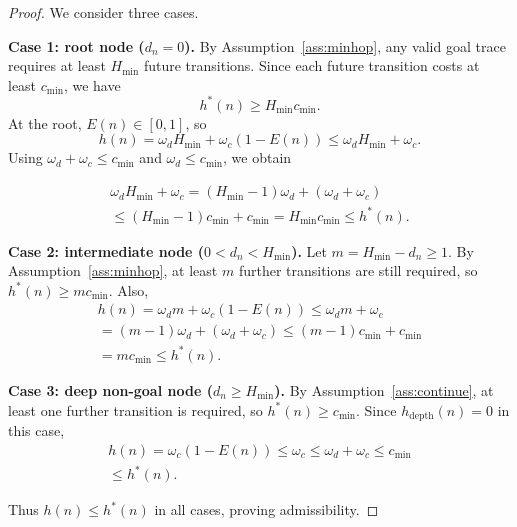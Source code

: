 \documentclass[11pt]{article}
\begin{document}
\begin{proof}
We consider three cases.

\noindent\textbf{Case 1: root node ($d_n=0$).}
By Assumption~\ref{ass:minhop}, any valid goal trace requires at least $H_{\min}$ future transitions. Since each future transition costs at least $c_{\min}$, we have
\[
h^*(n) \geq H_{\min} c_{\min}.
\]
At the root, $E(n) \in [0,1]$, so
\[
h(n) = \omega_d H_{\min} + \omega_c(1-E(n)) \leq \omega_d H_{\min} + \omega_c.
\]
Using $\omega_d + \omega_c \leq c_{\min}$ and $\omega_d \leq c_{\min}$, we obtain

\begin{equation}
  \begin{aligned}
    \omega_d H_{\min} + \omega_c
= (H_{\min}-1)\omega_d + (\omega_d+\omega_c) \\ 
\leq (H_{\min}-1)c_{\min} + c_{\min}
= H_{\min}c_{\min}
\leq h^*(n).
\end{aligned}  
\end{equation}



\noindent\textbf{Case 2: intermediate node ($0<d_n<H_{\min}$).}
Let $m = H_{\min}-d_n \geq 1$. By Assumption~\ref{ass:minhop}, at least $m$ further transitions are still required, so $h^*(n) \geq m c_{\min}$. Also,
\begin{equation}
\begin{aligned}
    h(n) = \omega_d m + \omega_c(1-E(n)) \leq \omega_d m + \omega_c
\\ = (m-1)\omega_d + (\omega_d+\omega_c)
\leq (m-1)c_{\min} + c_{\min}
\\ = m c_{\min}
\leq h^*(n).
\end{aligned}  
\end{equation}



\noindent\textbf{Case 3: deep non-goal node ($d_n \geq H_{\min}$).}
By Assumption~\ref{ass:continue}, at least one further transition is required, so $h^*(n) \geq c_{\min}$. Since $h_{\text{depth}}(n)=0$ in this case,
\begin{equation}
    \begin{aligned}
        h(n) = \omega_c(1-E(n)) \leq \omega_c \leq \omega_d + \omega_c \leq c_{\min} \\ 
        \leq h^*(n).
    \end{aligned}
\end{equation}


Thus $h(n) \leq h^*(n)$ in all cases, proving admissibility.
\end{proof}
\end{document}
